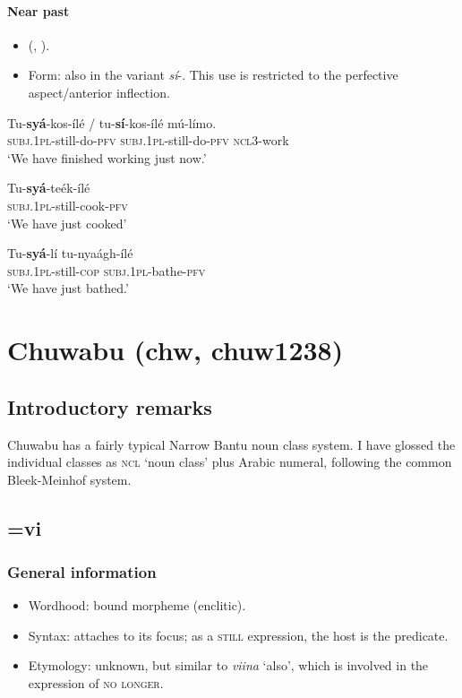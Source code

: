\paragraph{Near past}
\label{appendixBendeNearPast}
\begin{itemize}
	\item  \citeauthor{Abe2015} (\citeyear{Abe2015}, \citeyear{Abe2016}).
	\item Form: also in the variant \textit{sí}-. This use is restricted to the perfective aspect\slash anterior inflection.
\end{itemize}
\begin{exe}
	\ex 
	\gll Tu-\textbf{syá}-kos-ílé / tu-\textbf{sí}-kos-ílé mú-límo.\\
	\textsc{subj}.1\textsc{pl}-still-do-\textsc{pfv} {} \textsc{subj}.1\textsc{pl}-still-do-\textsc{pfv} \textsc{ncl}3-work\\
	\glt \lq We have finished working just now.’ \parencite[25]{Abe2015}

	\ex
	\gll Tu-\textbf{syá}-teék-ílé\\
	\textsc{subj}.1\textsc{pl}-still-cook-\textsc{pfv}\\
	\glt \lq We have just cooked\rq{ }\parencite{Abe2016}
	
	\ex
	\gll Tu-\textbf{syá}-lí tu-nyaágh-ílé\\
	\textsc{subj}.1\textsc{pl}-still-\textsc{cop} \textsc{subj}.1\textsc{pl}-bathe-\textsc{pfv}\\
	\glt \lq We have just bathed.\rq{ }\parencite{Abe2016}
\end{exe}

\section{Chuwabu (chw, chuw1238)} 
\label{appendixChuwabo}
\subsection{Introductory remarks}
Chuwabu has a fairly typical Narrow Bantu noun class system. I have glossed the individual classes as \textsc{ncl} \lq noun class' plus Arabic numeral, following the common Bleek-Meinhof system.

\subsection{=vi}
\subsubsection{General information}
\begin{itemize}
	\item Wordhood: bound morpheme (enclitic).
	\item Syntax: attaches to its focus; as a \textsc{still} expression, the host is the predicate.
	\item Etymology: unknown, but similar to \textit{viina} \lq also', which is involved in the expression of \textsc{no longer}.
\end{itemize}


